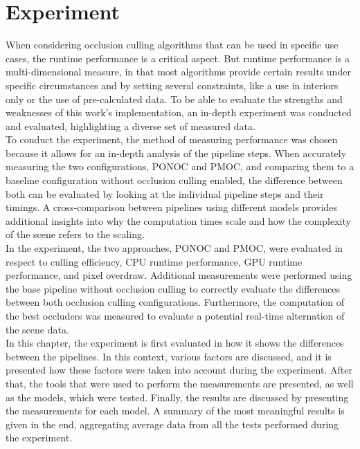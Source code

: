 \chapter{Experiment} \label{cpt-experiment}

When considering occlusion culling algorithms that can be used in specific use cases, the runtime 
performance is a critical aspect. But runtime performance is a multi-dimensional measure, in that 
most algorithms provide certain results under specific circumstances and by setting several constraints, 
like a use in interiors only or the use of pre-calculated data. To be able to evaluate the strengths 
and weaknesses of this work's implementation, an in-depth experiment was conducted and evaluated, 
highlighting a diverse set of measured data. \\

\noindent
To conduct the experiment, the method of measuring performance was chosen because it allows for 
an in-depth analysis of the pipeline steps. When accurately measuring the two configurations, 
\ac{PONOC} and \ac{PMOC}, and comparing them to a baseline configuration without occlusion culling 
enabled, the difference between both can be evaluated by looking at the individual pipeline steps 
and their timings. A cross-comparison between pipelines using different models provides additional 
insights into why the computation times scale and how the complexity of the scene refers to the scaling. \\

\noindent
In the experiment, the two approaches, \ac{PONOC} and \ac{PMOC}, were evaluated in respect to 
culling efficiency, \ac{CPU} runtime performance, \ac{GPU} runtime performance, and pixel overdraw.
Additional measurements were performed using the base pipeline without occlusion culling to 
correctly evaluate the differences between both occlusion culling configurations. Furthermore, 
the computation of the best occluders was measured to evaluate a potential real-time alternation 
of the scene data. \\

\noindent
In this chapter, the experiment is first evaluated in how it shows the differences between the pipelines. 
In this context, various factors are discussed, and it is presented how these factors were taken into account 
during the experiment. After that, the tools that were used to perform the measurements are presented, as 
well as the models, which were tested. Finally, the results are discussed by presenting the measurements 
for each model. A summary of the most meaningful results is given in the end, aggregating average data from 
all the tests performed during the experiment.

